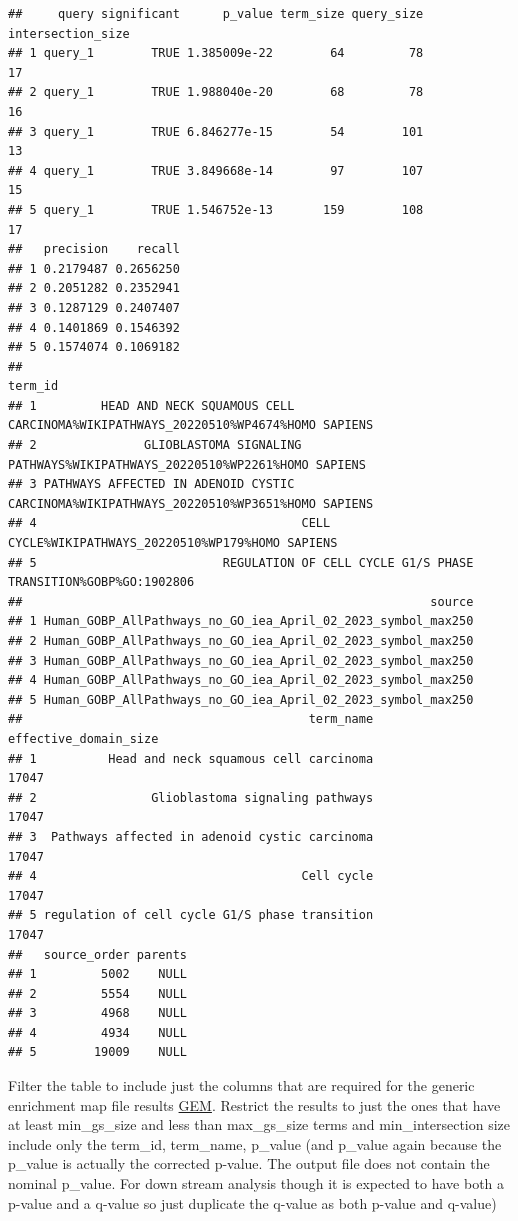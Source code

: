 \documentclass[
]{book}
\begin{document}
\begin{verbatim}
##     query significant      p_value term_size query_size intersection_size
## 1 query_1        TRUE 1.385009e-22        64         78                17
## 2 query_1        TRUE 1.988040e-20        68         78                16
## 3 query_1        TRUE 6.846277e-15        54        101                13
## 4 query_1        TRUE 3.849668e-14        97        107                15
## 5 query_1        TRUE 1.546752e-13       159        108                17
##   precision    recall
## 1 0.2179487 0.2656250
## 2 0.2051282 0.2352941
## 3 0.1287129 0.2407407
## 4 0.1401869 0.1546392
## 5 0.1574074 0.1069182
##                                                                                   term_id
## 1         HEAD AND NECK SQUAMOUS CELL CARCINOMA%WIKIPATHWAYS_20220510%WP4674%HOMO SAPIENS
## 2               GLIOBLASTOMA SIGNALING PATHWAYS%WIKIPATHWAYS_20220510%WP2261%HOMO SAPIENS
## 3 PATHWAYS AFFECTED IN ADENOID CYSTIC CARCINOMA%WIKIPATHWAYS_20220510%WP3651%HOMO SAPIENS
## 4                                     CELL CYCLE%WIKIPATHWAYS_20220510%WP179%HOMO SAPIENS
## 5                          REGULATION OF CELL CYCLE G1/S PHASE TRANSITION%GOBP%GO:1902806
##                                                         source
## 1 Human_GOBP_AllPathways_no_GO_iea_April_02_2023_symbol_max250
## 2 Human_GOBP_AllPathways_no_GO_iea_April_02_2023_symbol_max250
## 3 Human_GOBP_AllPathways_no_GO_iea_April_02_2023_symbol_max250
## 4 Human_GOBP_AllPathways_no_GO_iea_April_02_2023_symbol_max250
## 5 Human_GOBP_AllPathways_no_GO_iea_April_02_2023_symbol_max250
##                                        term_name effective_domain_size
## 1          Head and neck squamous cell carcinoma                 17047
## 2                Glioblastoma signaling pathways                 17047
## 3  Pathways affected in adenoid cystic carcinoma                 17047
## 4                                     Cell cycle                 17047
## 5 regulation of cell cycle G1/S phase transition                 17047
##   source_order parents
## 1         5002    NULL
## 2         5554    NULL
## 3         4968    NULL
## 4         4934    NULL
## 5        19009    NULL
\end{verbatim}

Filter the table to include just the columns that are required for the generic enrichment map file results \href{https://enrichmentmap.readthedocs.io/en/latest/FileFormats.html\#generic-results-files}{GEM}. Restrict the results to just the ones that have at least min\_gs\_size and less than max\_gs\_size terms and min\_intersection size include only the term\_id, term\_name, p\_value (and p\_value again because the p\_value is actually the corrected p-value. The output file does not contain the nominal p\_value. For down stream analysis though it is expected to have both a p-value and a q-value so just duplicate the q-value as both p-value and q-value)
\end{document}
